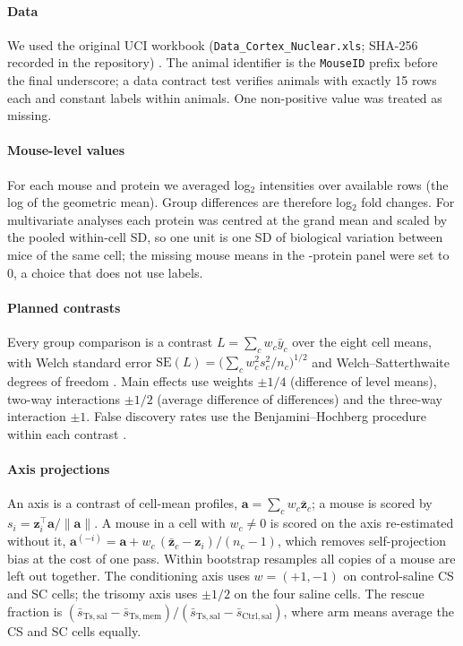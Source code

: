\documentclass[10pt]{article}
\newcommand{\tech}[1]{\texttt{#1}}
\begin{document}
\paragraph{Data} We used the original UCI workbook (\tech{Data\_Cortex\_Nuclear.xls}; SHA-256
recorded in the repository) \cite{uci2015}. The animal identifier is the \tech{MouseID} prefix
before the final underscore; a data contract test verifies \NMice{} animals with exactly 15 rows
each and constant labels within animals. One non-positive value was treated as missing.

\paragraph{Mouse-level values} For each mouse and protein we averaged log$_2$ intensities over
available rows (the log of the geometric mean). Group differences are therefore log$_2$ fold
changes. For multivariate analyses each protein was centred at the grand mean and scaled by the
pooled within-cell SD, so one unit is one SD of biological variation between mice of the same
cell; the \NImputed{} missing mouse means in the \NPanel-protein panel were set to 0, a choice
that does not use labels.

\paragraph{Planned contrasts} Every group comparison is a contrast $L = \sum_c w_c \bar y_c$ over
the eight cell means, with Welch standard error $\mathrm{SE}(L) = \big(\sum_c w_c^2
s_c^2/n_c\big)^{1/2}$ and Welch--Satterthwaite degrees of freedom \cite{welch1947}. Main effects
use weights $\pm 1/4$ (difference of level means), two-way interactions $\pm 1/2$ (average
difference of differences) and the three-way interaction $\pm 1$. False discovery rates use the
Benjamini--Hochberg procedure within each contrast \cite{bh1995}.

\paragraph{Axis projections} An axis is a contrast of cell-mean profiles, $\mathbf a = \sum_c
w_c \bar{\mathbf z}_c$; a mouse is scored by $s_i = \mathbf z_i^\top \mathbf a / \lVert\mathbf
a\rVert$. A mouse in a cell with $w_c \neq 0$ is scored on the axis re-estimated without it,
$\mathbf a^{(-i)} = \mathbf a + w_c\,(\bar{\mathbf z}_c - \mathbf z_i)/(n_c - 1)$, which removes
self-projection bias at the cost of one pass. Within bootstrap resamples all copies of a mouse
are left out together. The conditioning axis uses $w = (+1, -1)$ on control-saline CS and SC
cells; the trisomy axis uses $\pm 1/2$ on the four saline cells. The rescue fraction is
$(\bar s_{\mathrm{Ts,sal}} - \bar s_{\mathrm{Ts,mem}}) / (\bar s_{\mathrm{Ts,sal}} - \bar
s_{\mathrm{Ctrl,sal}})$, where arm means average the CS and SC cells equally.
\end{document}
